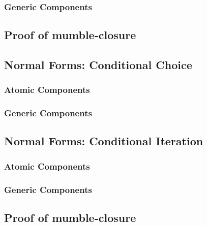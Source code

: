 \subsubsection{Generic Components}

\subsection{Proof of mumble-closure}

\subsection{Normal Forms: Conditional Choice}

\subsubsection{Atomic Components}

\subsubsection{Generic Components}

\subsection{Normal Forms: Conditional Iteration}

\subsubsection{Atomic Components}

\subsubsection{Generic Components}

\subsection{Proof of mumble-closure}


